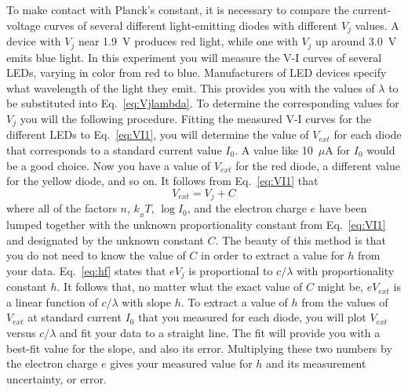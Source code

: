 \documentclass{revtex4}
\begin{document}
To make contact with Planck's constant, it is necessary to compare the
current-voltage curves of several different light-emitting diodes with
different $V_j$ values.  A device with $V_j$ near 1.9~V produces red light,
while one with $V_j$ up around 3.0~V emits blue light.  In this experiment
you will measure the V-I curves of several LEDs, varying in color from red
to blue.  Manufacturers of LED devices specify what wavelength of the light
they emit.  This provides you with the values of $\lambda$ to be substituted
into Eq.~\ref{eq:Vjlambda}.  To determine the corresponding values for $V_j$
you will the following procedure.  Fitting the measured V-I curves for the
different LEDs to Eq.~\ref{eq:VI1}, you will determine the value of $V_{ext}$
for each diode that corresponds to a standard current value $I_0$.  A value
like 10~$\mu$A for $I_0$ would be a good choice.  Now you have a value of
$V_{ext}$ for the red diode, a different value for the yellow diode, and so
on.  It follows from Eq.~\ref{eq:VI1} that
\begin{equation}
V_{ext} = V_j + C
\label{eq:linfit}
\end{equation}
where all of the factors $n$, $k_{_B} T$, $\log I_0$, and the electron charge
$e$ have been lumped together with the unknown proportionality constant from
Eq.~\ref{eq:VI1} and designated by the unknown constant $C$.  The beauty
of this method is that you do not need to know the value of $C$ in order
to extract a value for $h$ from your data.  Eq.~\ref{eq:hf} states
that $eV_j$ is proportional to $c/\lambda$ with proportionality constant
$h$.  It follows that, no matter what the exact value of $C$ might be,
$eV_{ext}$ is a linear function of $c/\lambda$ with slope $h$.  To extract
a value of $h$ from the values of $V_{ext}$ at standard current $I_0$
that you measured for each diode, you will plot $V_{ext}$ versus
$c/\lambda$ and fit your data to a straight line.  The fit will provide you
with a best-fit value for the slope, and also its error.  Multiplying these
two numbers by the electron charge $e$ gives your measured value for $h$
and its measurement uncertainty, or error.
\end{document}
